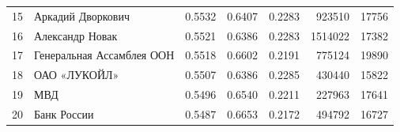 \documentclass[11pt,a4paper]{article}
\begin{document}
\begin{table}[htbp]
\begin{tabular}{r l S[table-format=1.4] S[table-format=1.4] S[table-format=1.4] r r}
15 & Аркадий Дворкович & 0.5532 & 0.6407 & 0.2283 & 923510 & 17756 \\
16 & Александр Новак & 0.5521 & 0.6386 & 0.2283 & 1514022 & 17382 \\
17 & Генеральная Ассамблея ООН & 0.5518 & 0.6602 & 0.2191 & 775124 & 19890 \\
18 & ОАО «ЛУКОЙЛ» & 0.5507 & 0.6386 & 0.2285 & 430440 & 15822 \\
19 & МВД & 0.5496 & 0.6540 & 0.2211 & 227963 & 17641 \\
20 & Банк России & 0.5487 & 0.6653 & 0.2172 & 494792 & 16727 \\\bottomrule
\end{tabular}
\end{table}
\end{document}
